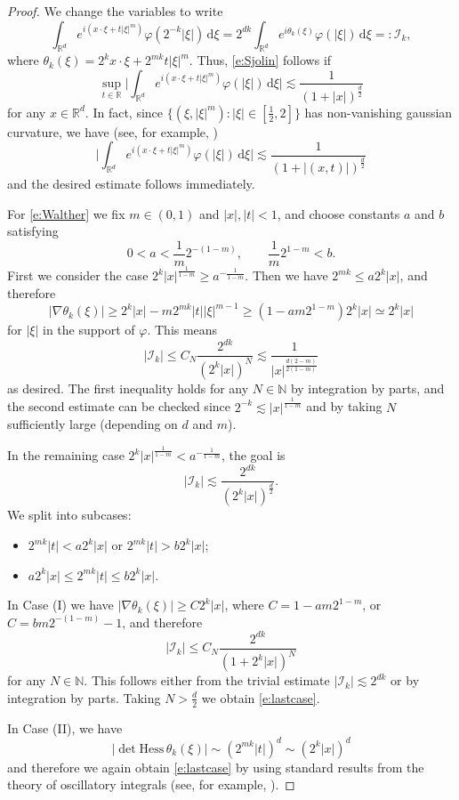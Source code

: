 \documentclass[a4paper]{amsart}
\numberwithin{equation}{section}%
\theoremstyle{plain}%
\theoremstyle{definition}
\theoremstyle{remark}%
\def\d{\mathrm{d}}
\newcommand{\I}{\mathcal{I}}
\begin{document}
\begin{proof}
We change the variables to write 
\[
\int_{\mathbb R^d} e^{i(x\cdot \xi+t|\xi|^m)}\varphi(2^{-k}|\xi|)\,\d\xi
=
2^{dk}
\int_{\mathbb R^d} e^{i\theta_k(\xi)}\varphi(|\xi|)\,\d\xi
=:
\I_k,
\]
where $\theta_k(\xi)=2^k x\cdot\xi+2^{mk}t|\xi|^m$. Thus, \eqref{e:Sjolin} follows if
\[
\sup_{t \in \mathbb{R}} \bigg|\int_{\mathbb R^d} e^{i(x\cdot\xi+t|\xi|^m)}\varphi(|\xi|)\,\d\xi\bigg| \lesssim \frac{1}{(1 + |x|)^{\frac{d}{2}}}
\]
for any $x \in \mathbb{R}^d$. In fact, since $\{ (\xi,|\xi|^m) : |\xi| \in [\frac{1}{2},2]\}$ has non-vanishing gaussian curvature, we have (see, for example, \cite[Section VIII]{Stein})
\[
\bigg|\int_{\mathbb R^d} e^{i(x\cdot\xi+t|\xi|^m)}\varphi(|\xi|)\,\d\xi\bigg| \lesssim \frac{1}{(1 + |(x,t)|)^{\frac{d}{2}}}
\]
and the desired estimate follows immediately.

For \eqref{e:Walther} we fix $m \in (0,1)$ and $|x|, |t| < 1$, and choose constants $a$ and $b$ satisfying
\[
0 < a < \frac{1}{m} 2^{-(1-m)}, \qquad \frac{1}{m}2^{1-m} < b. 
\]
First we consider the case $2^k|x|^{\frac{1}{1-m}} \geq a^{-\frac{1}{1-m}}$. Then we have $2^{mk} \leq a 2^k|x|$, and therefore
\[
|\nabla \theta_k(\xi)| \geq 2^k|x| - m2^{mk}|t||\xi|^{m-1} \geq (1 - a m2^{1-m})2^k|x| \simeq 2^k|x|
\]
for $|\xi|$ in the support of $\varphi$. This means
\[
|\mathcal{I}_k| \leq C_N \frac{2^{dk}}{(2^k|x|)^N} \lesssim \frac{1}{|x|^{\frac{d(2-m)}{2(1-m)}}}
\]
as desired. The first inequality holds for any $N \in \mathbb{N}$ by integration by parts, and the second estimate can be checked since $2^{-k} \lesssim |x|^{\frac{1}{1-m}}$ and by taking $N$ sufficiently large (depending on $d$ and $m$).

In the remaining case $2^k|x|^{\frac{1}{1-m}} < a^{-\frac{1}{1-m}}$, the goal is
\begin{equation} \label{e:lastcase}
|\mathcal{I}_k| \lesssim \frac{2^{dk}}{(2^k|x|)^\frac{d}{2}}.
\end{equation}
We split into subcases:
\begin{itemize}
\item[(I)] $2^{mk}|t| < a 2^k|x|$ or $2^{mk}|t| > b 2^k|x|$;
\item[(II)] $a 2^k|x| \leq 2^{mk}|t| \leq b 2^k|x|$.
\end{itemize}
In Case (I) we have $|\nabla \theta_k(\xi)| \geq C2^k|x|$, where $C = 1 - a m2^{1-m}$, or $C = b m2^{-(1-m)} -1$, and therefore
\[
|\mathcal{I}_k| \leq C_N \frac{2^{dk}}{(1 + 2^k|x|)^N}
\]
for any $N \in \mathbb{N}$. This follows either from the trivial estimate $|\I_k|\lesssim 2^{dk}$ or by integration by parts. Taking $N > \frac{d}{2}$ we obtain \eqref{e:lastcase}.

In Case (II), we have
\[
|\det \text{Hess}\, \theta_k(\xi)|
\sim 
(2^{mk}|t|)^d
\sim
(2^k|x|)^d
\]
and therefore we again obtain \eqref{e:lastcase} by using standard results from the theory of oscillatory integrals (see, for example, \cite[Section VIII]{Stein}).
\end{proof}
\end{document}
